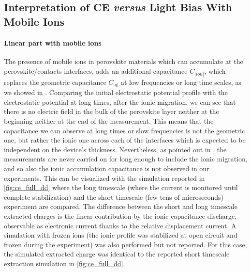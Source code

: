 	\subsection{Interpretation of CE \textsl{versus} Light Bias With Mobile Ions}

		\paragraph{Linear part with mobile ions}\label{ce_ions_linear}
		The presence of mobile ions in perovskite materials which can accumulate at the perovskite/contacts interfaces, adds an additional capacitance $C_|ion|$, which replaces the geometric capacitance $C_|g|$ at low frequencies or long time scales, as we showed in .
		Comparing the initial electrostatic potential profile with the electrostatic potential at long times, after the ionic migration, we can see that there is no electric field in the bulk of the perovskite layer neither at the beginning neither at the end of the measurement.
		This means that the capacitance we can observe at long times or slow frequencies is not the geometric one, but rather the ionic one across each of the interfaces which is expected to be independent on the device's thickness.
		Nevertheless, as pointed out in , the  measurements are never carried on for long enough to include the ionic migration, and so also the ionic accumulation capacitance is not observed in our experiments.
		This can be visualized with the simulation reported in \cref{fig:ce_full_dd} where the long timescale (where the current is monitored until complete stabilization) and the short timescale (few tens of microseconds)  experiment are compared.
		The difference between the short and long timescale extracted charges is the linear contribution by the ionic capacitance discharge, observable as electronic current thanks to the relative displacement current.
		A simulation with frozen ions (the ionic profile was stabilized at open circuit and frozen during the  experiment) was also performed but not reported.
		For this case, the simulated extracted charge was identical to the reported short timescale extraction simulation in \cref{fig:ce_full_dd}.

